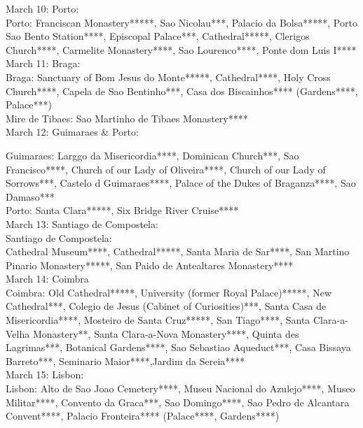March 10: Porto:\\

Porto: Franciscan Monastery*****, Sao Nicolau***, Palacio da Bolsa*****, Porto Sao Bento Station****, Episcopal Palace***, Cathedral*****, Clerigos Church****, Carmelite Monastery****, Sao Lourenco****, Ponte dom Luis I****\\

March 11: Braga:\\

Braga: Sanctuary of Bom Jesus do Monte*****, Cathedral****, Holy Cross Church****, Capela de Sao Bentinho***, Casa dos Biscainhos**** (Gardens****, Palace***)\\
Mire de Tibaes: Sao Martinho de Tibaes Monastery****\\

March 12: Guimaraes \& Porto:

Guimaraes: Larggo da Misericordia****, Dominican Church***, Sao Francisco****, Church of our Lady of Oliveira****, Church of our Lady of Sorrows***, Castelo d Guimaraes****, Palace of the Dukes of Braganza****, Sao Damaso***\\
Porto: Santa Clara*****, Six Bridge River Cruise****\\

March 13: Santiago de Compostela:\\

Santiago de Compostela:\\
Cathedral Museum****, Cathedral*****, Santa Maria de Sar****, San Martino Pinario Monastery*****, San Paido de Antealtares Monastery****\\

March 14: Coimbra\\

Coimbra: Old Cathedral*****, University (former Royal Palace)*****, New Cathedral***, Colegio de Jesus (Cabinet of Curiosities)***, Santa Casa de Misericordia****, Mosteiro de Santa Cruz*****,
San Tiago****, Santa Clara-a-Velha Monastery**, Santa Clara-a-Nova Monastery****, Quinta des Lagrimas***, Botanical Gardens****, Sao Sebastiao Aqueduct***, Casa Bissaya Barreto***, Seminario Maior****,Jardim da Sereia****\\

March 15: Lisbon:\\

Lisbon: Alto de Sao Joao Cemetery****, Museu Nacional do Azulejo****, Museo Militar****, Convento da Graca***, Sao Domingo****, Sao Pedro de Alcantara Convent****, Palacio Fronteira**** (Palace****, Gardens****)\\

